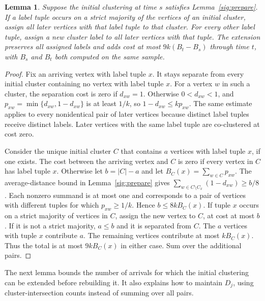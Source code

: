\documentclass[11pt]{article}
\newtheorem{lemma}[theorem]{Lemma}
\begin{document}
\begin{lemma}
\label{sig:extend}
Suppose the initial clustering at time $s$ satisfies Lemma~\ref{sig:prepare}.
If a label tuple occurs on a strict majority of the vertices of an initial cluster, assign all
later vertices with that label tuple to that cluster. For every other label tuple,
assign a new cluster label to all later vertices
with that tuple. The extension
preserves all assigned labels and adds cost at most
$9k(B_t-B_s)$ through time $t$, with $B_s$ and $B_t$ both computed on the same sample.
\end{lemma}
\begin{proof}
Fix an arriving vertex with label tuple $x$. It stays separate from every
initial cluster containing no vertex with label tuple $x$. For a vertex $w$
in such a cluster, the separation cost is zero if $d_{xw}=1$.
Otherwise $0<d_{xw}<1$, and $p_{xw}=\min\{d_{xw},1-d_{xw}\}$
is at least $1/k$, so $1-d_{xw}\le k p_{xw}$. The same estimate applies to every nonidentical pair of later
vertices because distinct label tuples receive distinct labels.
Later vertices with the same label tuple are co-clustered at cost zero.

Consider the unique initial cluster $C$ that contains $a$ vertices
with label tuple $x$, if one exists. The cost between the arriving vertex and $C$ is zero if every vertex
in $C$ has label tuple $x$. Otherwise let $b=|C|-a$ and let
$B_C(x)=\sum_{w\in C}p_{xw}$.
The average-distance bound in Lemma~\ref{sig:prepare} gives
$\sum_{w\in C\setminus C_x}(1-d_{xw})\ge b/8$. Each nonzero summand
is at most one and corresponds to a pair of vertices with different tuples for which
$p_{xw}\ge1/k$. Hence $b\le8kB_C(x)$.
If tuple $x$ occurs on a strict majority of vertices in $C$, assign the new
vertex to $C$, at cost at most $b$.
If it is not a strict majority, $a\le b$ and it is separated from $C$.
The $a$ vertices with tuple $x$ contribute $a$. The remaining vertices
contribute at most $k B_C(x)$. Thus the total is at most $9kB_C(x)$
in either case. Sum over the additional pairs.
\end{proof}

The next lemma bounds the number of arrivals for which the initial
clustering can be extended before rebuilding it. It also
explains how to maintain $D_j$, using cluster-intersection counts
instead of summing over all pairs.
\end{document}
